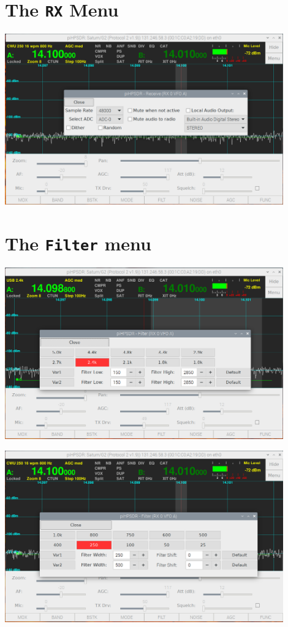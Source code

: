 \documentclass[12pt]{book}
\begin{document}
\section{The \texttt{RX} Menu}
\begin{center}
\includegraphics[width=12cm]{RXMenu.png}
\end{center}

\section{The \texttt{Filter} menu}
\begin{center}
\includegraphics[width=12cm]{FilterMenuUSB.png}
\end{center}
\begin{center}
\includegraphics[width=12cm]{FilterMenuCW.png}
\end{center}
\end{document}
